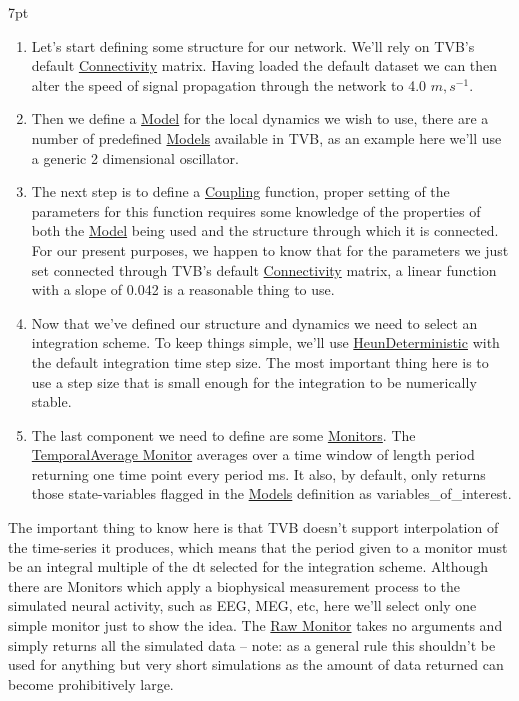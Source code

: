 \documentclass{tufte-handout}
\newenvironment{simulation}{%
  \def\FrameCommand{%
    \hspace{1pt}%
    {\color{ForestGreen}\vrule width 2pt}%
    {\color{simulationshade}\vrule width 4pt}%
    \colorbox{simulationshade}%
  }%
  \MakeFramed{\advance\hsize-\width\FrameRestore}%
  \noindent\hspace{-4.55pt}%
  \begin{adjustwidth}{}{7pt}%
  \vspace{2pt}\vspace{2pt}%
}
{%
  \vspace{2pt}\end{adjustwidth}\endMakeFramed%
}
\begin{document}
\begin{simulation}
\begin{enumerate}
\item Let's start defining some structure for our network. We'll rely on TVB's default \underline{Connectivity} matrix. Having loaded the default dataset we can then alter the speed of signal propagation through the network to 4.0 $m,s^{−1}$. 

\item Then we define a \underline{Model} for the local dynamics we wish to use, there are a number of predefined \underline{Models} available in TVB, as an example here we'll use a generic 2 dimensional oscillator.

\item The next step is to define a \underline{Coupling} function, proper setting of the parameters for this function requires some knowledge of the properties of both the \underline{Model} being used and the structure through which it is connected. For our present purposes, we happen to know that for the parameters we just set connected through TVB's default \underline{Connectivity} matrix, a linear function with a slope of 0.042 is a reasonable thing to use. 

\item Now that we've defined our structure and dynamics we need to select an integration scheme. 
To keep things simple, we'll use \underline{HeunDeterministic} with the default integration time step size. The most important thing here is to use a step size that is small enough for the integration to be numerically stable.

\item  The last component we need to define are some \underline{Monitors}. The \underline{TemporalAverage Monitor} averages over a time window of length period returning one time point every period ms. It also, by default, only returns those state-variables flagged in the \underline{Models} definition as variables\_of\_interest. 

\end{enumerate}
\end{simulation}


The important thing to know here is that TVB doesn't support interpolation of
the time-series it produces, which means that the period given to a monitor
must be an integral multiple of the dt selected for the integration scheme.
Although there are Monitors which apply a biophysical measurement process to
the simulated neural activity, such as EEG, MEG, etc, here we'll select only
one simple monitor just to show the idea. The \underline{Raw Monitor} takes no arguments
and simply returns all the simulated data -- note: as a general rule this
shouldn't be used for anything but very short simulations as the amount of
data returned can become prohibitively large.
\end{document}
